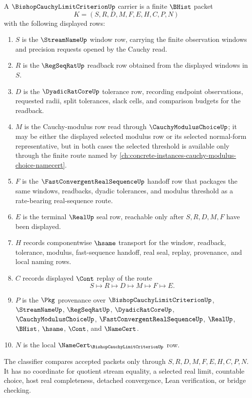 \begin{definition}
\label{def:bishop-cauchy-limit-criterion-carrier}
A $\BishopCauchyLimitCriterionUp$ carrier is a finite $\BHist$ packet
$$
K=(S,R,D,M,F,E,H,C,P,N)
$$
with the following displayed rows:
\begin{enumerate}
\item $S$ is the $\StreamNameUp$ window row, carrying the finite observation windows and precision requests opened by the Cauchy read.
\item $R$ is the $\RegSeqRatUp$ readback row obtained from the displayed windows in $S$.
\item $D$ is the $\DyadicRatCoreUp$ tolerance row, recording endpoint observations, requested radii, split tolerances, slack cells, and comparison budgets for the readback.
\item $M$ is the Cauchy-modulus row read through $\CauchyModulusChoiceUp$; it may be either the displayed selected modulus row or its selected normal-form representative, but in both cases the selected threshold is available only through the finite route named by \autoref{ch:concrete-instances-cauchy-modulus-choice-namecert}.
\item $F$ is the $\FastConvergentRealSequenceUp$ handoff row that packages the same windows, readbacks, dyadic tolerances, and modulus threshold as a rate-bearing real-sequence route.
\item $E$ is the terminal $\RealUp$ seal row, reachable only after $S,R,D,M,F$ have been displayed.
\item $H$ records componentwise $\hsame$ transport for the window, readback, tolerance, modulus, fast-sequence handoff, real seal, replay, provenance, and local naming rows.
\item $C$ records displayed $\Cont$ replay of the route
$$
S \longmapsto R \longmapsto D \longmapsto M \longmapsto F \longmapsto E .
$$
\item $P$ is the $\Pkg$ provenance over $\BishopCauchyLimitCriterionUp$, $\StreamNameUp$, $\RegSeqRatUp$, $\DyadicRatCoreUp$, $\CauchyModulusChoiceUp$, $\FastConvergentRealSequenceUp$, $\RealUp$, $\BHist$, $\hsame$, $\Cont$, and $\NameCert$.
\item $N$ is the local $\NameCert_{\BishopCauchyLimitCriterionUp}$ row.
\end{enumerate}
The classifier compares accepted packets only through $S,R,D,M,F,E,H,C,P,N$. It has no coordinate for quotient stream equality, a selected real limit, countable choice, host real completeness, detached convergence, Lean verification, or bridge checking.
\end{definition}

